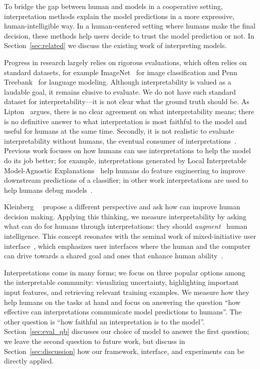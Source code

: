 To bridge the gap between human and  models in a cooperative
setting, interpretation methods 
explain the model predictions in a more expressive,
human-intelligible way. In a human-centered setting where humans make
the final decision, these methods help users decide to trust the
model prediction or not. In Section~\ref{sec:related} we discuss the
existing work of interpreting  models.

Progress in  research largely relies on rigorous evaluations,
which often relies on standard
datasets, for example ImageNet~\cite{deng2009imagenet} for image
classification and Penn Treebank~\cite{marcus1993building} for
language modeling.
Although interpretability is valued as a laudable goal, it remains
elusive to evaluate.
We do not have such standard dataset for interpretability---it is not
clear what the ground truth should be. As
Lipton~\cite{lipton2016mythos} argues, there is no clear agreement on what
interpretability means; there is no definitive answer to what
interpretation is most faithful to the model and useful for humans at
the same time. Secondly, it is not realistic to evaluate
interpretability without humans, the eventual consumer of
interpretations~\cite{narayanan2018humans}.
Previous work focuses on how humans can use interpretations to help
the model do its job better; for example, interpretations generated by
Local Interpretable Model-Agnostic
Explanations~\cite[]{ribeiro2016lime} help humans do feature
engineering to improve downstream predictions of a classifier; in
other work interpretations are used to help humans debug 
models~\cite{ribeiro2018semantically,fong2017interpretable}.

Kleinberg~\etal{}~\cite{kleinberg2017human} propose a different
perspective and ask how  can improve human decision making.
Applying this thinking, we measure
interpretability by asking what  can do
for humans through interpretations: they should
\emph{augment}~\cite{Koedinger-13} human intelligence. This concept
resonates with the seminal work of mixed-initiative user
interface~\cite{horvitz1999principles}, which emphasizes 
user interfaces where the human and the computer can drive towards a
shared goal and ones that enhance human ability~\cite{allen1999mixed}.

Interpretations come in many forms; we focus on three
popular options among the interpretable  community:
visualizing uncertainty, highlighting
important input features, and retrieving relevant training
examples.  We measure how they help humans on the tasks at hand and
focus on answering the question ``how effective can interpretations
communicate model predictions to humans''. The other question is ``how
faithful an interpretation is to the model''.
Section~\ref{sec:eval_qb} discusses our choice of model to answer the
first question; we leave the second question to future work, but
discuss in Section~\ref{sec:discussion} how our framework, interface,
and experiments can be directly applied.

